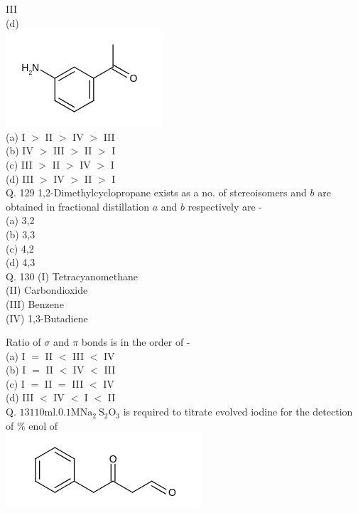 \documentclass[10pt]{article}
\begin{document}
III\\
(d)\\
\includegraphics{smile-a63d1168c055cacf1e1d4d6a0f9f591f9e0d0fa3}\\
(a) I $>$ II $>$ IV $>$ III\\
(b) IV $>$ III $>$ II $>$ I\\
(c) III $>$ II $>$ IV $>$ I\\
(d) III $>$ IV $>$ II $>$ I\\
Q. 129 1,2-Dimethylcyclopropane exists as a no. of stereoisomers and $b$ are obtained in fractional distillation $a$ and $b$ respectively are -\\
(a) 3,2\\
(b) 3,3\\
(c) 4,2\\
(d) 4,3\\
Q. 130 (I) Tetracyanomethane\\
(II) Carbondioxide\\
(III) Benzene\\
(IV) 1,3-Butadiene

Ratio of $\sigma$ and $\pi$ bonds is in the order of -\\
(a) I $=$ II $<$ III $<$ IV\\
(b) I $=$ II $<$ IV $<$ III\\
(c) I $=$ II $=$ III $<$ IV\\
(d) III $<$ IV $<$ I $<$ II\\
Q. $13110 \mathrm{ml} .0 .1 \mathrm{M} \mathrm{Na}_{2} \mathrm{~S}_{2} \mathrm{O}_{3}$ is required to titrate evolved iodine for the detection of $\%$ enol of\\
\includegraphics{smile-8d65d251700d2d197f5abd3e8e206c9369feb08c}
\end{document}
